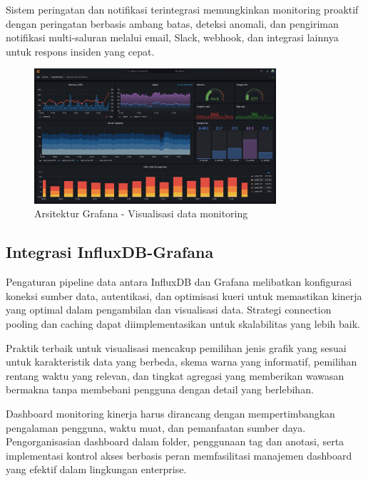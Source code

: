 Sistem peringatan dan notifikasi terintegrasi memungkinkan monitoring proaktif dengan peringatan berbasis ambang batas, deteksi anomali, dan pengiriman notifikasi multi-saluran melalui email, Slack, webhook, dan integrasi lainnya untuk respons insiden yang cepat.

\begin{figure}[htbp]
    \centering
    \includegraphics[width=0.8\textwidth]{assets/pics/bab3_20.png}
    \caption{Arsitektur Grafana - Visualisasi data monitoring}
    \label{fig:grafana_architecture}
\end{figure}

\subsection{Integrasi InfluxDB-Grafana}

Pengaturan pipeline data antara InfluxDB dan Grafana melibatkan konfigurasi koneksi sumber data, autentikasi, dan optimisasi kueri untuk memastikan kinerja yang optimal dalam pengambilan dan visualisasi data. Strategi connection pooling dan caching dapat diimplementasikan untuk skalabilitas yang lebih baik.

Praktik terbaik untuk visualisasi mencakup pemilihan jenis grafik yang sesuai untuk karakteristik data yang berbeda, skema warna yang informatif, pemilihan rentang waktu yang relevan, dan tingkat agregasi yang memberikan wawasan bermakna tanpa membebani pengguna dengan detail yang berlebihan.

Dashboard monitoring kinerja harus dirancang dengan mempertimbangkan pengalaman pengguna, waktu muat, dan pemanfaatan sumber daya. Pengorganisasian dashboard dalam folder, penggunaan tag dan anotasi, serta implementasi kontrol akses berbasis peran memfasilitasi manajemen dashboard yang efektif dalam lingkungan enterprise.